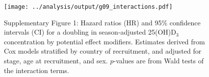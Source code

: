 \documentclass[a4paper,10pt]{article}
\begin{document}
\begin{figure}
 \centering
\caption*{Supplementary Figure 1: Hazard ratios (HR) and 95\% confidence intervals 
(CI) for a 
doubling in season-adjusted 25(OH)D$_3$ concentration by potential effect 
modifiers. \footnotesize{Estimates derived from Cox models stratified by country 
of recruitment, and adjusted for stage, age at recruitment, and sex. $p$-values 
are from Wald tests of the interaction terms.}}
\texttt{[image: ../analysis/output/g09\_interactions.pdf]}
\end{figure}

\end{document}
